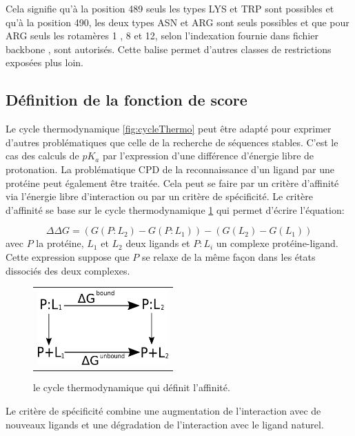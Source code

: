 Cela signifie qu'à la position 489 seuls les types LYS et TRP sont possibles et qu'à la position 490, les deux types ASN et ARG sont seuls possibles et que pour ARG seuls les rotamères 1 , 8  et 12, selon l'indexation fournie dans fichier \og backbone \fg, sont autorisés. Cette balise permet d'autres classes de restrictions exposées plus loin.

 \subsection{Définition de la fonction de score }

 Le cycle thermodynamique \ref{fig:cycleThermo} peut être adapté pour exprimer d'autres problématiques que celle de la recherche de séquences stables. C'est le cas des calculs de $pK_a$ par l'expression d'une différence d'énergie libre de protonation. La problématique CPD de la reconnaissance d'un ligand par une protéine peut également être traitée. Cela peut se faire par un critère d'affinité via l'énergie libre d'interaction ou par un critère de spécificité. Le critère d'affinité se base sur le cycle thermodynamique  \ref{fig:cycleThermoLigand} qui permet d'écrire l'équation:

 \begin{equation}
   \label{deltaG2}
\Delta \Delta G = (G(P:L_2)- G(P:L_1)) - (G(L_2) - G(L_1))
\end{equation}  
avec $P$ la protéine, $L_1$ et $L_2$ deux ligands et $P:L_i$ un complexe protéine-ligand. 
Cette expression suppose que $P$ se relaxe de la même façon dans les états dissociés des deux complexes. 

   \begin{figure}[!htbp]
     \centering
     \begin{tabular}{c}
       \includegraphics[width=5cm]{figure/cycleThermoLigand.png} &
     \end{tabular}
     
     \caption{le cycle thermodynamique qui définit l'affinité.}
\label{fig:cycleThermoLigand}
   \end{figure}

Le critère de spécificité combine une augmentation de l'interaction avec de nouveaux ligands et une dégradation de l'interaction avec le ligand naturel.

